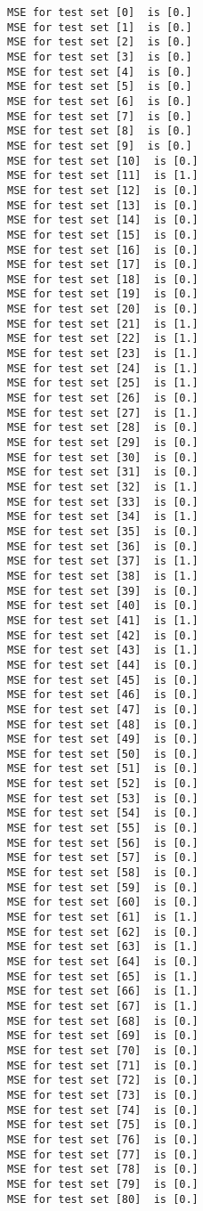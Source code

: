 \documentclass[11pt]{article}
\begin{document}
    \begin{Verbatim}[commandchars=\\\{\}]
MSE for test set [0]  is [0.]
MSE for test set [1]  is [0.]
MSE for test set [2]  is [0.]
MSE for test set [3]  is [0.]
MSE for test set [4]  is [0.]
MSE for test set [5]  is [0.]
MSE for test set [6]  is [0.]
MSE for test set [7]  is [0.]
MSE for test set [8]  is [0.]
MSE for test set [9]  is [0.]
MSE for test set [10]  is [0.]
MSE for test set [11]  is [1.]
MSE for test set [12]  is [0.]
MSE for test set [13]  is [0.]
MSE for test set [14]  is [0.]
MSE for test set [15]  is [0.]
MSE for test set [16]  is [0.]
MSE for test set [17]  is [0.]
MSE for test set [18]  is [0.]
MSE for test set [19]  is [0.]
MSE for test set [20]  is [0.]
MSE for test set [21]  is [1.]
MSE for test set [22]  is [1.]
MSE for test set [23]  is [1.]
MSE for test set [24]  is [1.]
MSE for test set [25]  is [1.]
MSE for test set [26]  is [0.]
MSE for test set [27]  is [1.]
MSE for test set [28]  is [0.]
MSE for test set [29]  is [0.]
MSE for test set [30]  is [0.]
MSE for test set [31]  is [0.]
MSE for test set [32]  is [1.]
MSE for test set [33]  is [0.]
MSE for test set [34]  is [1.]
MSE for test set [35]  is [0.]
MSE for test set [36]  is [0.]
MSE for test set [37]  is [1.]
MSE for test set [38]  is [1.]
MSE for test set [39]  is [0.]
MSE for test set [40]  is [0.]
MSE for test set [41]  is [1.]
MSE for test set [42]  is [0.]
MSE for test set [43]  is [1.]
MSE for test set [44]  is [0.]
MSE for test set [45]  is [0.]
MSE for test set [46]  is [0.]
MSE for test set [47]  is [0.]
MSE for test set [48]  is [0.]
MSE for test set [49]  is [0.]
MSE for test set [50]  is [0.]
MSE for test set [51]  is [0.]
MSE for test set [52]  is [0.]
MSE for test set [53]  is [0.]
MSE for test set [54]  is [0.]
MSE for test set [55]  is [0.]
MSE for test set [56]  is [0.]
MSE for test set [57]  is [0.]
MSE for test set [58]  is [0.]
MSE for test set [59]  is [0.]
MSE for test set [60]  is [0.]
MSE for test set [61]  is [1.]
MSE for test set [62]  is [0.]
MSE for test set [63]  is [1.]
MSE for test set [64]  is [0.]
MSE for test set [65]  is [1.]
MSE for test set [66]  is [1.]
MSE for test set [67]  is [1.]
MSE for test set [68]  is [0.]
MSE for test set [69]  is [0.]
MSE for test set [70]  is [0.]
MSE for test set [71]  is [0.]
MSE for test set [72]  is [0.]
MSE for test set [73]  is [0.]
MSE for test set [74]  is [0.]
MSE for test set [75]  is [0.]
MSE for test set [76]  is [0.]
MSE for test set [77]  is [0.]
MSE for test set [78]  is [0.]
MSE for test set [79]  is [0.]
MSE for test set [80]  is [0.]

\end{Verbatim}
\end{document}
